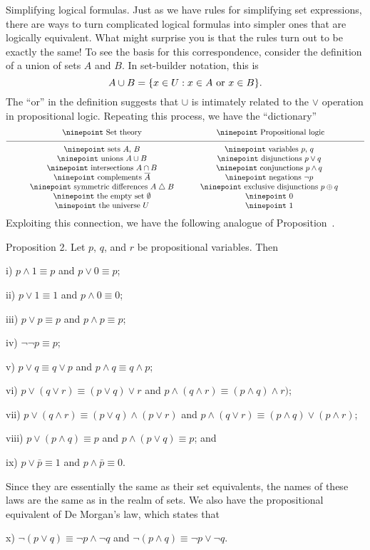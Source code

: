 \medskip\boldlabel Simplifying logical formulas. Just as we have rules for simplifying set expressions,
there are ways to turn complicated logical formulas into simpler ones that are logically equivalent.
What might surprise you is that the rules turn out to be exactly the same! To see the basis for this
correspondence, consider the definition of a union of sets $A$ and $B$. In set-builder notation,
this is
$$A \cup B = \{ x\in U : x\in A\ \hbox{or}\ x\in B\}.$$
The ``or'' in the definition suggests that $\cup$ is intimately related to the $\vee$ operation in
propositional logic. Repeating this process, we have the ``dictionary''
$$
\vbox{
\tabskip=3em plus.005em minus .005em
\halign{
\hfil{\ninepoint #}\hfil & \hfil{\ninepoint #}\hfil \cr
Set theory & Propositional logic\cr
\noalign{\medskip}
\noalign{\hrule}
\noalign{\medskip}
sets $A$, $B$ & variables $p$, $q$ \cr
unions $A\cup B$ & disjunctions $p\vee q$ \cr
intersections $A\cap B$ & conjunctions $p\wedge q$ \cr
complements $\bar A$ & negations $\neg p$ \cr
symmetric differences $A\symdiff B$ & exclusive disjunctions $p\oplus q$ \cr
the empty set $\emptyset$ & $0$ \cr
the universe $U$ & $1$ \cr
}}
$$
Exploiting this connection, we have the following analogue of Proposition~{\propsetlaws}.

\proclaim Proposition 2. Let $p$, $q$, and $r$ be propositional variables. Then
\medskip
\item{i)} $p\wedge 1 \equiv p$ and $p\vee 0 \equiv p$;
\smallskip
\item{ii)} $p \vee 1 \equiv 1$ and $p \wedge 0 \equiv 0$;
\smallskip
\item{iii)} $p \vee p \equiv p$ and $p\wedge p \equiv p$;
\smallskip
\item{iv)} $\neg\neg p \equiv p$;
\smallskip
\item{v)} $p \vee q \equiv q \vee p$ and $p\wedge q \equiv q\wedge p $;
\smallskip
\item{vi)} $p\vee (q\vee r) \equiv (p\vee q) \vee r$ and $p\wedge (q\wedge r) \equiv (p\wedge q)\wedge r)$;
\smallskip
\item{vii)} $p\vee (q\wedge r) \equiv (p\vee q) \wedge (p\vee r)$ and
$p\wedge (q\vee r) \equiv (p\wedge q)\vee (p\wedge r)$;
\smallskip
\item{viii)} $p\vee (p\wedge q) \equiv p$ and $p\wedge (p\vee q) \equiv p$; and
\smallskip
\item{ix)} $p\vee \bar p \equiv 1$ and $p\wedge \bar p \equiv 0$.\slug
\medskip

Since they are essentially the same as their set equivalents, the names of these laws are the same as in the
realm of sets.
We also have the propositional equivalent of De Morgan's law, which states that
\medskip\begingroup\sl
\item{x)} $\neg(p\vee q) \equiv \neg p \wedge \neg q$ and $\neg(p\wedge q) \equiv \neg p \vee \neg q$.\endgroup%
\medskip

